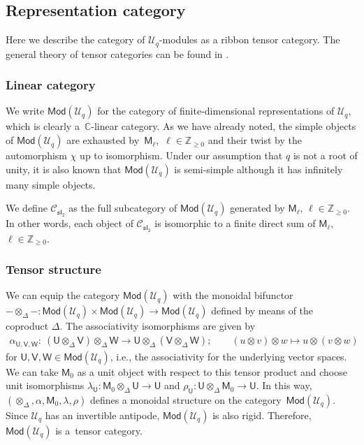 \documentclass[pdftex]{sigma}
\numberwithin{equation}{section}
\newcommand{\catMod}{\mathsf{Mod}}
\newcommand{\bC}{\mathbb{C}}
\newcommand{\bZ}{\mathbb{Z}}
\newcommand{\cC}{\mathcal{C}}
\newcommand{\cU}{\mathcal{U}}
\newcommand{\fsl}{\mathfrak{sl}}
\newcommand{\sfM}{\mathsf{M}}
\newcommand{\sfU}{\mathsf{U}}
\newcommand{\sfV}{\mathsf{V}}
\newcommand{\sfW}{\mathsf{W}}
\newcommand{\UEA}{\cU}
\newcommand{\Uq}{\UEA_{q}}
\newcommand{\QGirrep}[1]{\sfM_{#1}}
\newcommand{\QGcoprod}{\Delta}
\newcommand{\catQG}{\cC_{\fsl_{2}}}
\newcommand{\QGrepU}{\sfU}
\newcommand{\QGrepV}{\sfV}
\newcommand{\QGrepW}{\sfW}
\begin{document}
\subsection{Representation category}
Here we describe the category of $\Uq$-modules as a ribbon tensor category.
The general theory of tensor categories can be found in \cite{BakalovKirillovJr2001,etingof2015tensor}.

\subsubsection{Linear category}
We write $\catMod (\Uq)$ for the category of finite-dimensional representations of $\Uq$, which is clearly a~$\bC$-linear category.
As we have already noted, the simple objects of $\catMod(\Uq)$ are exhausted by~$\QGirrep{\ell}$,~$\ell\in\bZ_{\geq 0}$ and their twist by the automorphism $\chi$ up to isomorphism.
Under our assumption that $q$ is not a root of unity, it is also known that $\catMod(\Uq)$ is semi-simple although it has infinitely many simple objects.

We define $\catQG$ as the full subcategory of $\catMod(\Uq)$ generated by $\QGirrep{\ell}$, $\ell\in\bZ_{\geq 0}$.
In other words, each object of $\catQG$ is isomorphic to a finite direct sum of $\QGirrep{\ell}$, $\ell\in\bZ_{\geq 0}$.

\subsubsection{Tensor structure}
We can equip the category $\catMod (\Uq)$ with the monoidal bifunctor $-\otimes_{\QGcoprod}-\colon \catMod(\Uq)\times\catMod(\Uq)\to \catMod(\Uq)$ defined by means of the coproduct $\QGcoprod$.
The associativity isomorphisms are given by
\begin{gather*}
 \alpha_{\QGrepU,\QGrepV,\QGrepW}\colon\ (\QGrepU\otimes_{\QGcoprod}\QGrepV)\otimes_{\QGcoprod} \QGrepW\to \QGrepU\otimes_{\QGcoprod} (\QGrepV\otimes_{\QGcoprod}\QGrepW);\qquad (u\otimes v)\otimes w\mapsto u\otimes (v\otimes w)
\end{gather*}
for $\QGrepU,\QGrepV,\QGrepW\in\catMod (\Uq)$,
i.e., the associativity for the underlying vector spaces.
We can take $\QGirrep{0}$ as a unit object with respect to this tensor product and choose unit isomorphisms $\lambda_{\QGrepU}\colon \QGirrep{0}\otimes_{\QGcoprod} \QGrepU\to\QGrepU$ and $\rho_{\QGrepU}\colon \QGrepU\otimes_{\QGcoprod}\QGirrep{0}\to\QGrepU$.
In this way, $(\otimes_{\QGcoprod},\alpha,\QGirrep{0},\lambda,\rho)$ defines a monoidal structure on the category~$\catMod (\Uq)$.
Since $\Uq$ has an invertible antipode, $\catMod(\Uq)$ is also rigid.
Therefore, $\catMod(\Uq)$ is a~tensor category.
\end{document}
